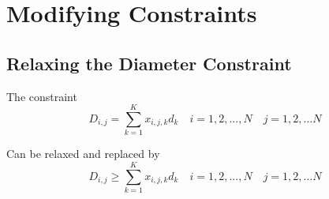 \documentclass[12pt]{article}
\begin{document}
	\section{Modifying Constraints}

	\subsection{Relaxing the Diameter Constraint}
	The constraint 
	\begin{equation}
	D_{i,j} = \sum_{k=1}^{K}x_{i,j,k}d_k \quad i = 1, 2, ..., N \quad j = 1, 2, ... N
	\end{equation}
	
	Can be relaxed and replaced by 
	\begin{equation}
	D_{i,j} \geq \sum_{k=1}^{K}x_{i,j,k}d_k \quad i = 1, 2, ..., N \quad j = 1, 2, ... N
	\end{equation}
	
\end{document}

